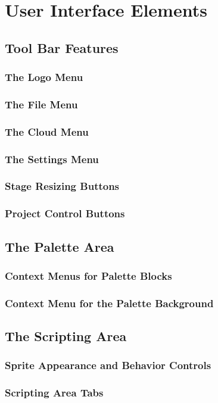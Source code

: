 \documentclass{report}
\begin{document}
\chapter{User Interface Elements}
\section{Tool Bar Features}
\subsection{The \Snap{} Logo Menu}
\subsection{The File Menu}
\subsection{The Cloud Menu}
\subsection{The Settings Menu}
\subsection{Stage Resizing Buttons}
\subsection{Project Control Buttons}
\section{The Palette Area}
\subsection{Context Menus for Palette Blocks}
\subsection{Context Menu for the Palette Background}
\section{The Scripting Area}
\subsection{Sprite Appearance and Behavior Controls}
\subsection{Scripting Area Tabs}
\end{document}
